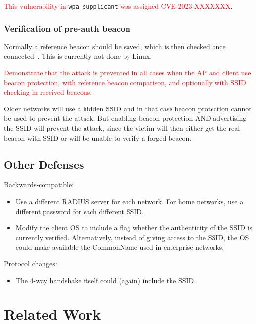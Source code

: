 \documentclass[sigconf,review,anonymous]{acmart}
\DeclareRobustCommand{\red}[1]{\textcolor{red}{#1}}
\begin{document}
\red{This vulnerability in} \verb|wpa_supplicant| \red{was assigned CVE-2023-XXXXXXX}.

\subsubsection{Verification of pre-auth beacon}

Normally a reference beacon should be saved, which is then checked once connected~\cite{vanhoef-wisec2020}.
This is currently not done by Linux.

\red{Demonstrate that the attack is prevented in all cases when the AP and client use beacon protection, with reference beacon comparison, and optionally with SSID checking in received beacons.}

Older networks will use a hidden SSID and in that case beacon protection cannot be used to prevent the attack.
But enabling beacon protection AND advertising the SSID will prevent the attack, since the victim will then either get the real beacon with SSID or will be unable to verify a forged beacon.

\subsection{Other Defenses}

Backwards-compatible:
\begin{itemize}
	\item Use a different RADIUS server for each network.
	For home networks, use a different password for each different SSID.
	\item Modify the client OS to include a flag whether the authenticity of the SSID is currently verified.
	Alternatively, instead of giving access to the SSID, the OS could make available the CommonName used in enterprise networks.
\end{itemize}

Protocol changes:
\begin{itemize}
	\item The 4-way handshake itself could (again) include the SSID.
\end{itemize}


\section{Related Work}
\label{sec:relatedwork}
\end{document}
